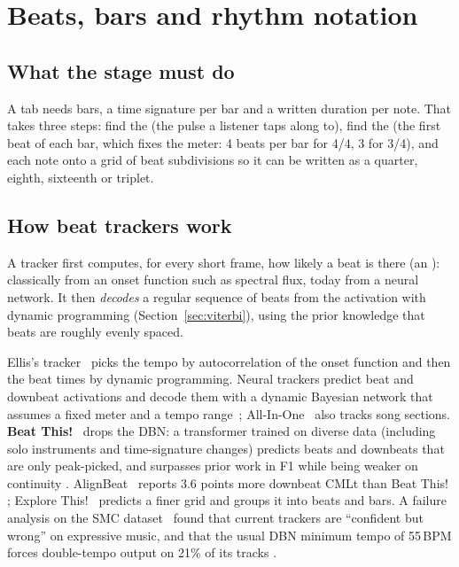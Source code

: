\section{Beats, bars and rhythm notation}
\label{sec:rhythm}

\subsection{What the stage must do}

A tab needs bars, a time signature per bar and a written duration per note.
That takes three steps: find the  (the pulse a listener taps along
to), find the  (the first beat of each bar, which fixes the
meter: 4 beats per bar for 4/4, 3 for 3/4), and  each note onto
a grid of beat subdivisions so it can be written as a quarter, eighth,
sixteenth or triplet.

\subsection{How beat trackers work}

\begin{keyidea}
A tracker first computes, for every short frame, how likely a beat is there (an
): classically from an onset function such as spectral flux,
today from a neural network. It then \emph{decodes} a regular sequence of beats
from the activation with dynamic programming (Section~\ref{sec:viterbi}), using
the prior knowledge that beats are roughly evenly spaced.
\end{keyidea}

Ellis's tracker~\cite{ellis2007beat} picks the tempo by autocorrelation of the
onset function and then the beat times by dynamic programming. Neural trackers
predict beat and downbeat activations and decode them with a dynamic Bayesian
network that assumes a fixed meter and a tempo range~\cite{bock2016joint};
All-In-One~\cite{kim2023allinone} also tracks song sections.
\textbf{Beat This!}~\cite{foscarin2024beatthis} drops the DBN: a transformer
trained on diverse data (including solo instruments and time-signature changes)
predicts beats and downbeats that are only peak-picked, and surpasses prior
work in F1 while being weaker on continuity \reported.
AlignBeat~\cite{ahn2025alignbeat} reports 3.6 points more downbeat CMLt than
Beat This! \reported; Explore This!~\cite{kihlborg2026explore} predicts a finer
 grid and groups it into beats and bars. A failure analysis on the
SMC dataset~\cite{ahn2026smc} found that current trackers are ``confident but
wrong'' on expressive music, and that the usual DBN minimum tempo of 55\,BPM
forces double-tempo output on 21\% of its tracks \reported.

